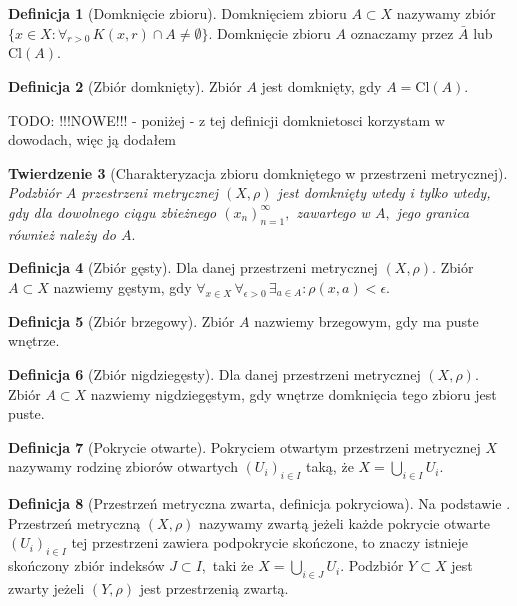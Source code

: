 \documentclass[licencjacka]{pwr_wmat_praca_dyplomowa}
\theoremstyle{plain}
\newtheorem{theorem}{Twierdzenie}
\numberwithin{theorem}{chapter}
\theoremstyle{definition}
\numberwithin{theorem}{chapter}
\newtheorem{definition}[theorem]{Definicja}
\begin{document}
\begin{definition}[Domknięcie zbioru]
Domknięciem zbioru $A \subset X$ nazywamy zbiór $\{x \in X: \forall_{r>0} \, K(x, r) \cap A \neq \emptyset\}$. Domknięcie zbioru $A$ oznaczamy przez $\bar{A}$ lub $\textrm{Cl}(A)$.
\end{definition}

\begin{definition}[Zbiór domknięty]
Zbiór $A$ jest domknięty, gdy $A = \textrm{Cl}(A)$.
\end{definition}

{\color{red}TODO: !!!NOWE!!! - poniżej - z tej definicji domknietosci korzystam w dowodach, więc ją dodałem

\begin{theorem}[Charakteryzacja zbioru domkniętego w przestrzeni metrycznej]
Podzbiór $A$ przestrzeni metrycznej $(X, \rho)$ jest domknięty wtedy i tylko wtedy, gdy dla dowolnego ciągu zbieżnego $(x_n)_{n=1}^{\infty},$ zawartego w  $A,$ jego granica również należy do $A.$
\end{theorem}

}

\begin{definition}[Zbiór gęsty]
Dla danej przestrzeni metrycznej $(X, \rho)$. Zbiór $A \subset X$ nazwiemy gęstym, gdy $\forall_{x \in X} \, \forall_{\epsilon>0} \, \exists_{a \in A} : \rho(x, a) < \epsilon$.
\end{definition}

\begin{definition}[Zbiór brzegowy]
Zbiór $A$ nazwiemy brzegowym, gdy ma puste wnętrze.
\end{definition}

\begin{definition}[Zbiór nigdziegęsty]
Dla danej przestrzeni metrycznej $(X, \rho)$. Zbiór $A \subset X$ nazwiemy nigdziegęstym, gdy wnętrze domknięcia tego zbioru jest puste.
\end{definition}

\begin{definition}[Pokrycie otwarte]
\cite[s.~195]{ruette2017chaos}
Pokryciem otwartym przestrzeni metrycznej $X$ nazywamy rodzinę zbiorów otwartych $(U_i)_{i \in I}$ taką, że $X=\bigcup_{i \in I}U_i$.
\end{definition}

\begin{definition}[Przestrzeń metryczna zwarta, definicja pokryciowa]
Na podstawie \cite[s.~196]{ruette2017chaos}.
Przestrzeń metryczną $(X, \rho)$ nazywamy zwartą jeżeli każde pokrycie otwarte $(U_i)_{i \in I}$ tej przestrzeni zawiera podpokrycie skończone, to znaczy istnieje skończony zbiór indeksów $J \subset I,$ taki że $X = \bigcup_{i \in J}U_i$.
Podzbiór $Y \subset X$ jest zwarty jeżeli $(Y, \rho)$ jest przestrzenią zwartą.
\end{definition}
\end{document}
